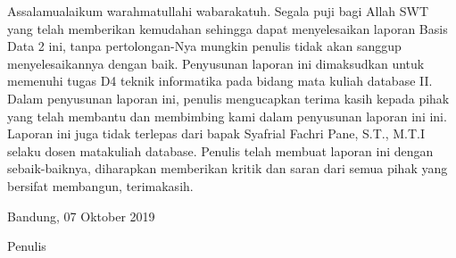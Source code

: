 \begin{acknowledgements}
Assalamualaikum warahmatullahi wabarakatuh. Segala puji bagi Allah SWT yang telah memberikan kemudahan sehingga dapat menyelesaikan laporan Basis Data 2 ini, tanpa pertolongan-Nya mungkin penulis tidak akan sanggup menyelesaikannya dengan baik. Penyusunan laporan ini dimaksudkan untuk memenuhi tugas D4 teknik informatika pada bidang mata kuliah database II. Dalam penyusunan laporan ini, penulis mengucapkan terima kasih kepada pihak yang telah membantu dan membimbing kami dalam penyusunan laporan ini ini. Laporan ini juga tidak terlepas dari bapak Syafrial Fachri Pane, S.T., M.T.I selaku dosen matakuliah database. Penulis telah membuat laporan ini dengan sebaik-baiknya, diharapkan memberikan kritik dan saran dari semua pihak yang bersifat membangun, terimakasih.

\begin{raggedleft}

Bandung, 07 Oktober 2019

Penulis

\end{raggedleft}

\end{acknowledgements}